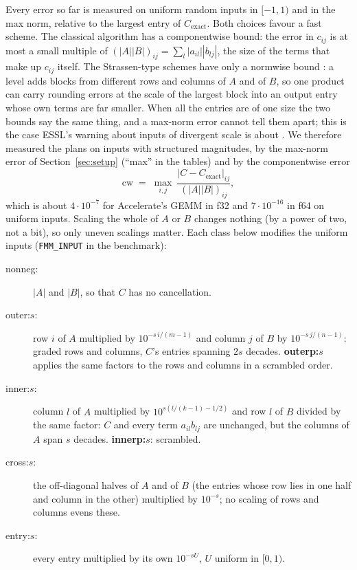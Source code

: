 \documentclass[11pt]{article}
\begin{document}
Every error so far is measured on uniform random inputs in $[-1,1)$ and in
the max norm, relative to the largest entry of $C_{\mathrm{exact}}$.  Both
choices favour a fast scheme.  The classical algorithm has a componentwise
bound: the error in $c_{ij}$ is at most a small multiple of
$(|A||B|)_{ij}=\sum_l |a_{il}||b_{lj}|$, the size of the terms that make up
$c_{ij}$ itself.  The Strassen-type schemes have only a normwise bound
\cite{Higham02}: a level adds blocks from different rows and columns of $A$
and of $B$, so one product can carry rounding errors at the scale of the
largest block into an output entry whose own terms are far smaller.  When
all the entries are of one size the two bounds say the same thing, and a
max-norm error cannot tell them apart; this is the case ESSL's warning about
inputs of divergent scale is about \cite{ESSL}.  We therefore measured the
plans on inputs with structured magnitudes, by the max-norm error of Section~\ref{sec:setup} (``max'' in the tables) and by the componentwise error
$$
\text{cw} \;=\; \max_{i,j}\ \frac{|C-C_{\mathrm{exact}}|_{ij}}{(|A||B|)_{ij}},
$$
which is about $4\cdot10^{-7}$ for Accelerate's GEMM in f32 and
$7\cdot10^{-16}$ in f64 on uniform inputs.  Scaling the whole of $A$ or $B$
changes nothing (by a power of two, not a bit), so only uneven scalings
matter.  Each class below modifies the uniform inputs (\texttt{FMM\_INPUT}
in the benchmark):
\begin{description}
\item[nonneg:] $|A|$ and $|B|$, so that $C$ has no cancellation.
\item[outer:$s$:] row $i$ of $A$ multiplied by $10^{-s\,i/(m-1)}$ and
  column $j$ of $B$ by $10^{-s\,j/(n-1)}$: graded rows and columns, $C$'s
  entries spanning $2s$ decades.  \textbf{outerp:$s$} applies the same factors
  to the rows and columns in a scrambled order.
\item[inner:$s$:] column $l$ of $A$ multiplied by $10^{s(l/(k-1)-1/2)}$ and
  row $l$ of $B$ divided by the same factor: $C$ and every term
  $a_{il}b_{lj}$ are unchanged, but the columns of $A$ span $s$ decades.
  \textbf{innerp:$s$}: scrambled.
\item[cross:$s$:] the off-diagonal halves of $A$ and of $B$ (the entries
  whose row lies in one half and column in the other) multiplied by
  $10^{-s}$; no scaling of rows and columns evens these.
\item[entry:$s$:] every entry multiplied by its own $10^{-sU}$, $U$ uniform
  in $[0,1)$.
\end{description}
\end{document}
